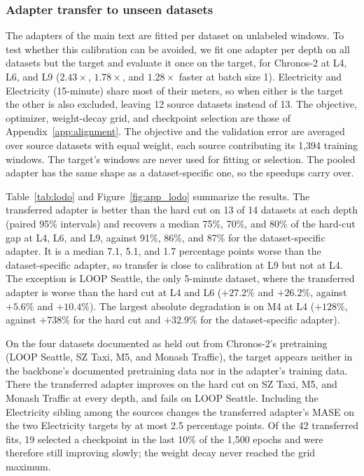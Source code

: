 
\subsubsection{Adapter transfer to unseen datasets}
\label{sec:app_lodo}

The adapters of the main text are fitted per dataset on unlabeled windows. To test whether this calibration can be avoided, we fit one adapter per depth on all datasets but the target and evaluate it once on the target, for Chronos-2 at L4, L6, and L9 ($2.43\times$, $1.78\times$, and $1.28\times$ faster at batch size 1). Electricity and Electricity (15-minute) share most of their meters, so when either is the target the other is also excluded, leaving 12 source datasets instead of 13. The objective, optimizer, weight-decay grid, and checkpoint selection are those of Appendix~\ref{app:alignment}. The objective and the validation error are averaged over source datasets with equal weight, each source contributing its 1,394 training windows. The target's windows are never used for fitting or selection. The pooled adapter has the same shape as a dataset-specific one, so the speedups carry over.

Table~\ref{tab:lodo} and Figure~\ref{fig:app_lodo} summarize the results. The transferred adapter is better than the hard cut on 13 of 14 datasets at each depth (paired 95\% intervals) and recovers a median 75\%, 70\%, and 80\% of the hard-cut gap at L4, L6, and L9, against 91\%, 86\%, and 87\% for the dataset-specific adapter. It is a median 7.1, 5.1, and 1.7 percentage points worse than the dataset-specific adapter, so transfer is close to calibration at L9 but not at L4. The exception is LOOP Seattle, the only 5-minute dataset, where the transferred adapter is worse than the hard cut at L4 and L6 ($+27.2\%$ and $+26.2\%$, against $+5.6\%$ and $+10.4\%$). The largest absolute degradation is on M4 at L4 ($+128\%$, against $+738\%$ for the hard cut and $+32.9\%$ for the dataset-specific adapter).

On the four datasets documented as held out from Chronos-2's pretraining (LOOP Seattle, SZ Taxi, M5, and Monash Traffic), the target appears neither in the backbone's documented pretraining data nor in the adapter's training data. There the transferred adapter improves on the hard cut on SZ Taxi, M5, and Monash Traffic at every depth, and fails on LOOP Seattle. Including the Electricity sibling among the sources changes the transferred adapter's MASE on the two Electricity targets by at most 2.5 percentage points. Of the 42 transferred fits, 19 selected a checkpoint in the last 10\% of the 1,500 epochs and were therefore still improving slowly; the weight decay never reached the grid maximum.

